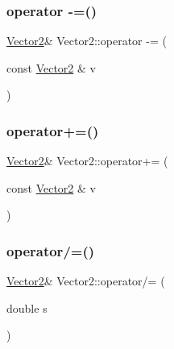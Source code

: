 \mbox{\label{struct_vector2_ac5bf883e874f5c961476ac2592c18cd7}} 
\subsubsection{\texorpdfstring{operator -\/=()}{operator -=()}}
{\footnotesize\ttfamily \mbox{\hyperlink{struct_vector2}{Vector2}}\& Vector2\+::operator -\/= (\begin{DoxyParamCaption}\item[{const \mbox{\hyperlink{struct_vector2}{Vector2}} \&}]{v }\end{DoxyParamCaption})\hspace{0.3cm}{\ttfamily [inline]}}

\mbox{\label{struct_vector2_a4aa43747680ca286b4e274c8d85478d5}} 
\subsubsection{\texorpdfstring{operator+=()}{operator+=()}}
{\footnotesize\ttfamily \mbox{\hyperlink{struct_vector2}{Vector2}}\& Vector2\+::operator+= (\begin{DoxyParamCaption}\item[{const \mbox{\hyperlink{struct_vector2}{Vector2}} \&}]{v }\end{DoxyParamCaption})\hspace{0.3cm}{\ttfamily [inline]}}

\mbox{\label{struct_vector2_a043e5e4bd08aa631d23ca89760d43939}} 
\subsubsection{\texorpdfstring{operator/=()}{operator/=()}}
{\footnotesize\ttfamily \mbox{\hyperlink{struct_vector2}{Vector2}}\& Vector2\+::operator/= (\begin{DoxyParamCaption}\item[{double}]{s }\end{DoxyParamCaption})\hspace{0.3cm}{\ttfamily [inline]}}

